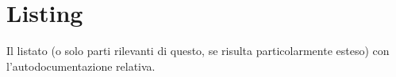 \chapter{Listing}
\label{appC}

\noindent Il listato (o solo parti rilevanti di questo, se risulta particolarmente esteso) con l'autodocumentazione relativa.